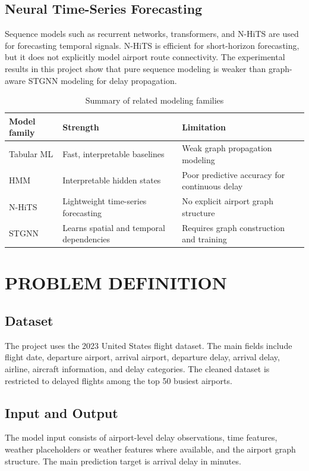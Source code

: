 \documentclass[12pt,a4paper]{report}
\begin{document}
\section{Neural Time-Series Forecasting}
Sequence models such as recurrent networks, transformers, and N-HiTS are used for forecasting temporal signals. N-HiTS is efficient for short-horizon forecasting, but it does not explicitly model airport route connectivity. The experimental results in this project show that pure sequence modeling is weaker than graph-aware STGNN modeling for delay propagation.

\begin{table}[H]
	\centering
	\caption{Summary of related modeling families}
	\begin{tabular}{p{4cm}p{5cm}p{4cm}}
		\toprule
		\textbf{Model family} & \textbf{Strength} & \textbf{Limitation} \\
		\midrule
		Tabular ML & Fast, interpretable baselines & Weak graph propagation modeling \\
		HMM & Interpretable hidden states & Poor predictive accuracy for continuous delay \\
		N-HiTS & Lightweight time-series forecasting & No explicit airport graph structure \\
		STGNN & Learns spatial and temporal dependencies & Requires graph construction and training \\
		\bottomrule
	\end{tabular}
	\label{tab:related_models}
\end{table}

\chapter{PROBLEM DEFINITION}
\noindent{\rule{\textwidth}{1.5pt}}

\section{Dataset}
The project uses the 2023 United States flight dataset. The main fields include flight date, departure airport, arrival airport, departure delay, arrival delay, airline, aircraft information, and delay categories. The cleaned dataset is restricted to delayed flights among the top 50 busiest airports.

\section{Input and Output}
The model input consists of airport-level delay observations, time features, weather placeholders or weather features where available, and the airport graph structure. The main prediction target is arrival delay in minutes.
\end{document}
